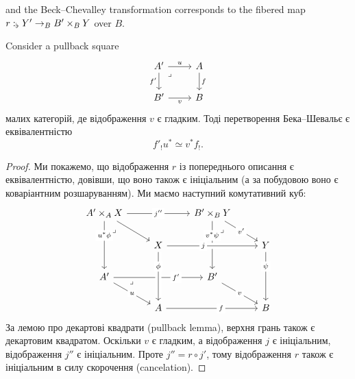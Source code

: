 \documentclass[12pt]{article}
\newcommand{\GM}{\flat}
\begin{document}
and the Beck--Chevalley transformation corresponds to the fibered map $\DeclVar{r}{\GM}{Y' \to_B B' \times_B Y}$ over $B$.

\begin{thm}
  Consider a pullback square
  \[\begin{tikzcd}
	{A'} & A \\
	{B'} & B
	\arrow["u", from=1-1, to=1-2]
	\arrow["{{f'}}"', from=1-1, to=2-1]
	\arrow["\lrcorner"{anchor=center, pos=0.125}, draw=none, from=1-1, to=2-2]
	\arrow["f", from=1-2, to=2-2]
	\arrow["v"', from=2-1, to=2-2]
\end{tikzcd}\]
малих категорій, де відображення $v$ є гладким. Тоді перетворення Бека--Шевальє є еквівалентністю
\[ f'_! u^* \simeq v^* f_!.\]
\end{thm}

\begin{proof}
Ми покажемо, що відображення $r$ із попереднього описання є еквівалентністю, довівши, що воно також є ініціальним (а за побудовою воно є коваріантним розшаруванням). Ми маємо наступний комутативний куб:
\[\begin{tikzcd}
	{A' \times_A X} && {B' \times_B Y} \\
	& X && Y \\
	{A'} && {B'} \\
	& A && B
	\arrow["{j''}"{description}, from=1-1, to=1-3]
	\arrow[from=1-1, to=2-2]
	\arrow["{u^*\phi}"{description, pos=0.3}, from=1-1, to=3-1]
	\arrow["\lrcorner"{anchor=center, pos=0.125}, draw=none, from=1-1, to=4-2]
	\arrow["{v'}"{description},from=1-3, to=2-4]
	\arrow["{v^*\psi}"{description, pos=0.3}, from=1-3, to=3-3]
	\arrow["\lrcorner"{anchor=center, pos=0.125}, draw=none, from=1-3, to=4-4]
	\arrow["j"{description, pos=0.4}, from=2-2, to=2-4, crossing over]
	\arrow["\psi"{description, pos=0.3}, from=2-4, to=4-4]
	\arrow["{f'}"{description, pos=0.7}, from=3-1, to=3-3]
	\arrow["u"{description}, from=3-1, to=4-2]
	\arrow["v"{description}, from=3-3, to=4-4]
	\arrow["f"{description, pos=0.6}, from=4-2, to=4-4]
  \arrow["\phi"{description, pos=0.3}, from=2-2, to=4-2, crossing over]
  \arrow["\lrcorner"{anchor=center, pos=0.125}, draw=none, from=3-1, to=4-4]
\end{tikzcd}\]
За лемою про декартові квадрати (pullback lemma), верхня грань також є декартовим квадратом. Оскільки $v$ є гладким, а відображення $j$ є ініціальним, відображення $j''$ є ініціальним. Проте $j'' = r \circ j'$, тому відображення $r$ також є ініціальним в силу скорочення (cancelation).
\end{proof}
\end{document}
